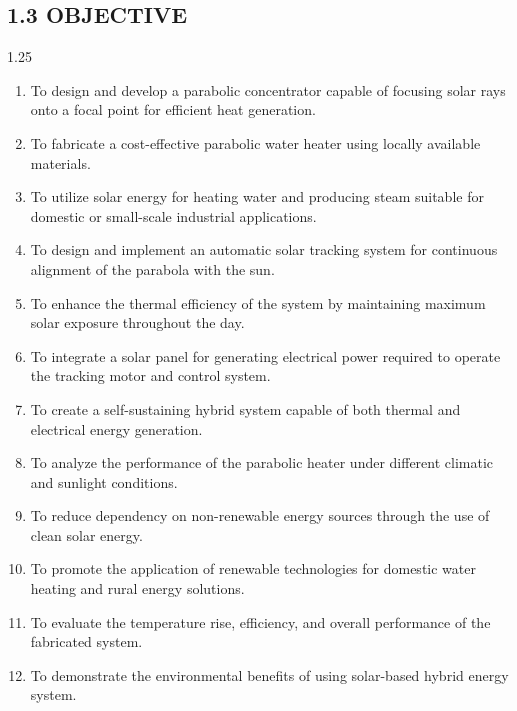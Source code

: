 \subsection*{1.3 OBJECTIVE}
\vspace{3mm}

\begin{spacing}{1.25}
{\fontsize{10.5}{14.5}\selectfont
\begin{enumerate}[leftmargin=8mm, itemsep=2.5mm]
  \item To design and develop a parabolic concentrator capable of focusing solar rays onto a focal point for efficient heat generation.
  \item To fabricate a cost-effective parabolic water heater using locally available materials.
  \item To utilize solar energy for heating water and producing steam suitable for domestic or small-scale industrial applications.
  \item To design and implement an automatic solar tracking system for continuous alignment of the parabola with the sun.
  \item To enhance the thermal efficiency of the system by maintaining maximum solar exposure throughout the day.
  \item To integrate a solar panel for generating electrical power required to operate the tracking motor and control system.
  \item To create a self-sustaining hybrid system capable of both thermal and electrical energy generation.
  \item To analyze the performance of the parabolic heater under different climatic and sunlight conditions.
  \item To reduce dependency on non-renewable energy sources through the use of clean solar energy.
  \item To promote the application of renewable technologies for domestic water heating and rural energy solutions.
  \item To evaluate the temperature rise, efficiency, and overall performance of the fabricated system.
  \item To demonstrate the environmental benefits of using solar-based hybrid energy system.
\end{enumerate}
}
\end{spacing}
\clearpage
